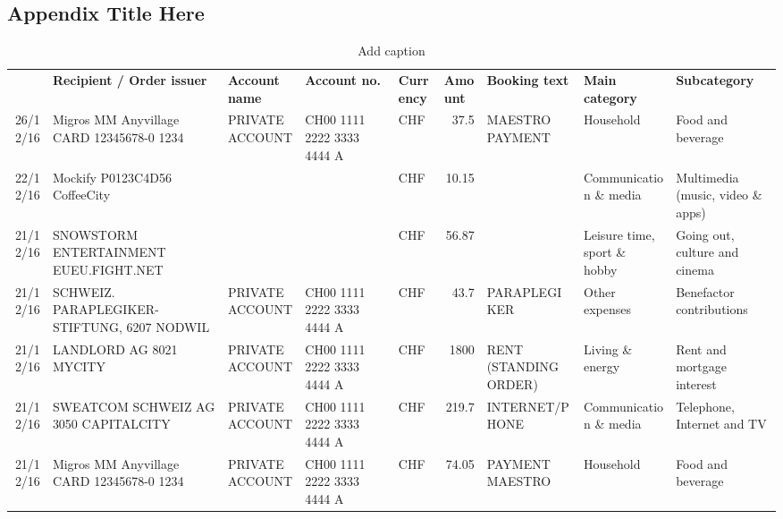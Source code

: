 
\begin{landscape}

\chapter{Appendix Title Here} %

\label{AppendixA} %


\begin{table}[h]
	\begin{center}
	\caption{Add caption}
	\begin{tabular}{rllllrlll}
		\rowcolor[rgb]{ .859,  .859,  .859} \multicolumn{1}{l}{\textbf{Date}} & \textbf{Recipient / Order issuer} & \textbf{Account name} & \textbf{Account no.} & \textbf{Currency} & \multicolumn{1}{l}{\textbf{Amount}} & \textbf{Booking text} & \textbf{Main category} & \textbf{Subcategory} \\
		26/12/16 & Migros MM Anyvillage CARD 12345678-0 1234 & PRIVATE ACCOUNT & CH00 1111 2222 3333 4444 A & CHF   & 37.5  & MAESTRO PAYMENT & Household & Food and beverage \\
		22/12/16 & Mockify P0123C4D56       CoffeeCity &       &       & CHF   & 10.15 &       & Communication \& media & Multimedia (music, video \& apps) \\
		21/12/16 & SNOWSTORM ENTERTAINMENT EUEU.FIGHT.NET &       &       & CHF   & 56.87 &       & Leisure time, sport \& hobby & Going out, culture and cinema \\
		21/12/16 & SCHWEIZ. PARAPLEGIKER- STIFTUNG, 6207 NODWIL & PRIVATE ACCOUNT & CH00 1111 2222 3333 4444 A & CHF   & 43.7  & PARAPLEGIKER & Other expenses & Benefactor contributions \\
		21/12/16 & LANDLORD AG 8021 MYCITY & PRIVATE ACCOUNT & CH00 1111 2222 3333 4444 A & CHF   & 1800  & RENT (STANDING ORDER) & Living \& energy & Rent and mortgage interest \\
		21/12/16 & SWEATCOM SCHWEIZ AG 3050 CAPITALCITY & PRIVATE ACCOUNT & CH00 1111 2222 3333 4444 A & CHF   & 219.7 & INTERNET/PHONE & Communication \& media & Telephone,  Internet and TV \\
		21/12/16 & Migros MM Anyvillage CARD 12345678-0 1234 & PRIVATE ACCOUNT & CH00 1111 2222 3333 4444 A & CHF   & 74.05 & PAYMENT MAESTRO & Household & Food and beverage \\

\end{tabular}
\end{center}
\end{table}
\end{landscape}
